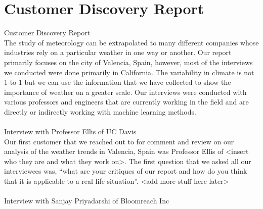 \documentclass[10pt]{article}
\begin{document}
\section{Customer Discovery Report}\label{sec:7}
Customer Discovery Report\\
The study of meteorology can be extrapolated to many different companies whose industries rely on a particular weather in one way or another. Our report primarily focuses on the city of Valencia, Spain, however, most of the interviews we conducted were done primarily in California. The variability in climate is not 1-to-1 but we can use the information that we have collected to show the importance of weather on a greater scale. Our interviews were conducted with various professors and engineers that are currently working in the field and are directly or indirectly working with machine learning methods. 
\\
\\
Interview with Professor Ellis of UC Davis\\
Our first customer that we reached out to for comment and review on our analysis of the weather trends in Valencia, Spain was Professor Ellis of <insert who they are and what they work on>. The first question that we asked all our interviewees was, “what are your critiques of our report and how do you think that it is applicable to a real life situation”. <add more stuff here later> 
\\
\\
Interview with Sanjay Priyadarshi of Bloomreach Inc
\end{document}
